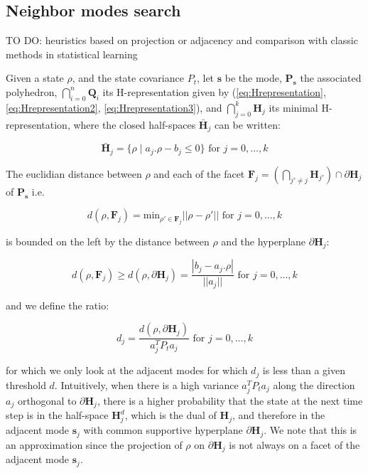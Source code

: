 \documentclass[11pt]{article}
\numberwithin{equation}{section}
\numberwithin{figure}{section}
\numberwithin{table}{section}
\begin{document}
\subsection{Neighbor modes search}

TO DO: heuristics based on projection or adjacency and comparison with classic methods in statistical learning 

Given a state $\rho$, and the state covariance $P_{t}$, let $\boldsymbol s$ be the mode, $\textbf{P}_{\boldsymbol s}$ the associated polyhedron, $\bigcap_{i=0}^{n} \textbf{Q}_{i}$ its H-representation given by (\ref{eq:Hrepresentation}, \ref{eq:Hrepresentation2}, \ref{eq:Hrepresentation3}), and $\bigcap_{j=0}^{k} \textbf{H}_{j}$ its minimal H-representation, where the closed half-spaces $\bar{\textbf{H}}_{j}$ can be written:

\begin{equation}
\bar{\textbf{H}}_{j} = \{\rho \mid a_{j}.\rho-b_{j} \leq 0\} \text{ for }j=0,...,k
\label{eq:halfSpace}
\end{equation}

\noindent The euclidian distance between $\rho$ and each of the facet $\textbf{F}_{j}=(\bigcap_{j'\neq j}\textbf{H}_{j'})\cap\partial\textbf{H}_{j}$ of $\textbf{P}_{\boldsymbol s}$ i.e.

\begin{equation}
d(\rho,\textbf{F}_{j}) = \text{min}_{\rho'\in \textbf{F}_{j}} ||\rho-\rho'|| \text{ for }j=0,...,k
\label{eq:distance}
\end{equation}

\noindent is bounded on the left by the distance between $\rho$ and the hyperplane $\partial\textbf{H}_{j}$:

\begin{equation}
d(\rho,\textbf{F}_{j})\geq d(\rho,\partial\textbf{H}_{j})=\frac{|b_{j}-a_{j}.\rho|}{||a_{j}||} \text{ for }j=0,...,k
\label{eq:lowerBound}
\end{equation}

\noindent and we define the ratio:

\begin{equation}
d_{j}=\frac{d(\rho,\partial\textbf{H}_{j})}{a^{T}_{j} P_{t} a_{j}}\text{ for }j=0,...,k
\label{eq:ratio}
\end{equation}

\noindent for which we only look at the adjacent modes for which $d_{j}$ is less than a given threshold $d$. Intuitively, when there is a high variance $a^{T}_{j} P_{t} a_{j}$ along the direction $a_{j}$ orthogonal to $\partial\textbf{H}_{j}$, there is a higher probability that the state at the next time step is in the half-space $\textbf{H}^{d}_{j}$, which is the dual of $\textbf{H}_{j}$, and therefore in the adjacent mode $\boldsymbol s_{j}$ with common supportive hyperplane $\partial\textbf{H}_{j}$. We note that this is an approximation since the projection of $\rho$ on $\partial\textbf{H}_{j}$ is not always on a facet of the adjacent mode $\boldsymbol s_{j}$.
\end{document}
